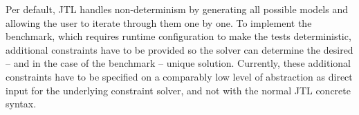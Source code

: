 Per default, JTL handles non-determinism by generating all possible models and allowing the user to iterate through them one by one.
To implement the benchmark, which requires runtime configuration to make the tests deterministic, additional constraints have to be provided so the solver can determine the desired -- and in the case of the benchmark -- unique solution.
Currently, these additional constraints have to be specified on a comparably low level of abstraction as direct input for the underlying constraint solver, and not with the normal JTL concrete syntax.



